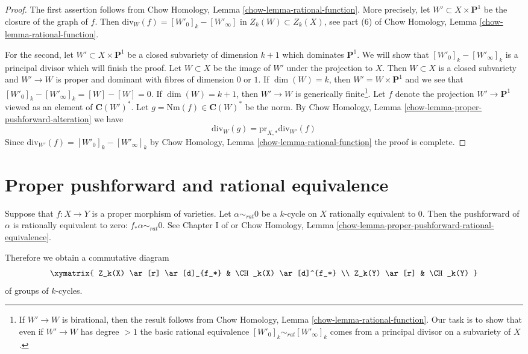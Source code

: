 \begin{proof}
The first assertion follows from
Chow Homology, Lemma \ref{chow-lemma-rational-function}.
More precisely, let $W' \subset X \times \mathbf{P}^1$ be the closure
of the graph of $f$. Then $\text{div}_W(f) = [W'_0]_k - [W'_\infty]$
in $Z_k(W) \subset Z_k(X)$, see part (6) of
Chow Homology, Lemma \ref{chow-lemma-rational-function}.

\medskip\noindent
For the second, let $W' \subset X \times \mathbf{P}^1$ be a closed
subvariety of dimension $k + 1$ which dominates $\mathbf{P}^1$.
We will show that $[W'_0]_k - [W'_\infty]_k$ is a principal divisor
which will finish the proof. Let $W \subset X$ be the image of $W'$
under the projection to $X$. Then $W \subset X$ is a closed subvariety
and $W' \to W$ is proper and dominant with fibres of dimension $0$
or $1$. If $\dim(W) = k$, then $W' = W \times \mathbf{P}^1$ and we
see that $[W'_0]_k - [W'_\infty]_k = [W] - [W] = 0$.
If $\dim(W) = k + 1$, then
$W' \to W$ is generically finite\footnote{If $W' \to W$ is birational,
then the result follows from
Chow Homology, Lemma \ref{chow-lemma-rational-function}.
Our task is to show that even if $W' \to W$
has degree $> 1$ the basic rational equivalence
$[W'_0]_k \sim_{rat} [W'_\infty]_k$ comes from a principal divisor
on a subvariety of $X$.}. Let $f$ denote the projection $W' \to \mathbf{P}^1$
viewed as an element of $\mathbf{C}(W')^*$. Let
$g = \text{Nm}(f) \in \mathbf{C}(W)^*$ be the norm. By
Chow Homology, Lemma \ref{chow-lemma-proper-pushforward-alteration}
we have
$$
\text{div}_W(g) = \text{pr}_{X, *}\text{div}_{W'}(f)
$$
Since $\text{div}_{W'}(f) = [W'_0]_k - [W'_\infty]_k$ 
by Chow Homology, Lemma \ref{chow-lemma-rational-function}
the proof is complete.
\end{proof}


\section{Proper pushforward and rational equivalence}
\label{section-pushforward-and-rational-equivalence}

\noindent
Suppose that $f : X \to Y$ is a proper morphism of varieties.
Let $\alpha \sim_{rat} 0$ be a $k$-cycle on
$X$ rationally equivalent to $0$. Then the {pushforward}
of $\alpha$ is rationally equivalent to zero:
$f_* \alpha \sim_{rat} 0$. See Chapter I of \cite{F} or
Chow Homology, Lemma \ref{chow-lemma-proper-pushforward-rational-equivalence}.

\medskip\noindent
Therefore we obtain a commutative diagram
$$
\xymatrix{
Z_k(X) \ar[r] \ar[d]_{f_*} & \CH_k(X) \ar[d]^{f_*} \\
Z_k(Y) \ar[r] & \CH_k(Y)
}
$$
of groups of $k$-cycles.


